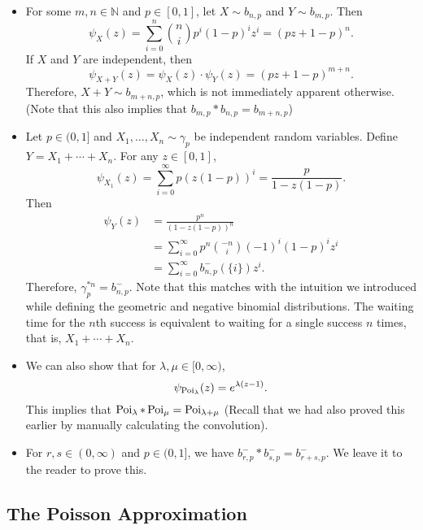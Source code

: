 \begin{itemize}
    \item For some $m,n\in\mathbb{N}$ and $p\in[0,1]$, let $X\sim b_{n,p}$ and $Y\sim b_{m,p}$. Then
    $$\psi_X(z)=\sum_{i=0}^n \binom{n}{i}p^i(1-p)^iz^i=(pz+1-p)^n.$$
    If $X$ and $Y$ are independent, then
    $$\psi_{X+Y}(z)=\psi_X(z)\cdot\psi_Y(z)=(pz+1-p)^{m+n}.$$
    Therefore, $X+Y\sim b_{m+n,p}$, which is not immediately apparent otherwise. (Note that this also implies that $b_{m,p}*b_{n,p}=b_{m+n,p}$)

    \item Let $p\in(0,1]$ and $X_1,\ldots,X_n\sim \gamma_p$ be independent random variables. Define $Y=X_1+\cdots+X_n$. For any $z\in[0,1]$,
    $$\psi_{X_1}(z)=\sum_{i=0}^\infty p(z(1-p))^i=\frac{p}{1-z(1-p)}.$$
    Then
    \begin{align*}
        \psi_Y(z) &= \frac{p^n}{(1-z(1-p))^n} \\
        &= \sum_{i=0}^\infty p^n \binom{-n}{i}(-1)^i(1-p)^i z^i \\
        &= \sum_{i=0}^\infty b^-_{n,p}(\{i\}) z^i.
    \end{align*}
    Therefore, $\gamma_p^{*n}=b^-_{n,p}$. Note that this matches with the intuition we introduced while defining the geometric and negative binomial distributions. The waiting time for the $n$th success is equivalent to waiting for a single success $n$ times, that is, $X_1+\cdots+X_n$.
    
    \item We can also show that for $\lambda,\mu\in[0,\infty)$,
    $$\psi_{\operatorname{Poi}_{\lambda}}(z)=e^{\lambda(z-1)}.$$
    This implies that $\operatorname{Poi}_\lambda * \operatorname{Poi}_{\mu} = \operatorname{Poi}_{\lambda+\mu}$ (Recall that we had also proved this earlier by manually calculating the convolution).
    
    \item For $r,s\in(0,\infty)$ and $p\in(0,1]$, we have $b^-_{r,p}*b^-_{s,p}=b^-_{r+s,p}$. We leave it to the reader to prove this.
\end{itemize}

\subsection{The Poisson Approximation}

